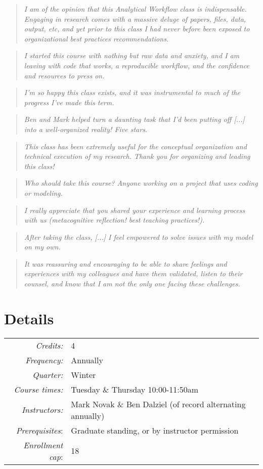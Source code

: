 \documentclass[10pt]{article}
\begin{document}
\begin{quote}
	\emph{I am of the opinion that this Analytical Workflow class is indispensable. Engaging in research 
	comes with a massive deluge of papers, files, data, output, etc, and yet prior to this class I had never 
	before been exposed to organizational best practices recommendations.}
\end{quote}
\begin{quote}
	\emph{I started this course with nothing but raw data and anxiety, and I am leaving with code that 
		works, a reproducible workflow, and the confidence and resources to press on.}
\end{quote}
\begin{quote}
	\emph{I'm so happy this class exists, and it was instrumental to much of the progress I've made this 
	term.}
\end{quote}
\begin{quote}
\emph{Ben and Mark helped turn a daunting task that I'd been putting off [...] into a 
well-organized reality! Five stars.}
\end{quote}
\begin{quote}
	\emph{This class has been extremely useful for the conceptual organization and technical execution 
	of my research. Thank you for organizing and leading this class!}
\end{quote}
\begin{quote}
	\emph{Who should take this course?  Anyone working on a project that uses coding or modeling.}
\end{quote}
\begin{quote}
	\emph{I really appreciate that you shared your experience and learning process with us (metacognitive 
		reflection! best teaching practices!).}
\end{quote}
\begin{quote}
	\emph{After taking the class, [...] I feel empowered to solve issues with my model on my own.}
\end{quote}
\begin{quote}
	\emph{It was reassuring and encouraging to be able to share feelings and experiences with my 
	colleagues and have them validated, listen to their counsel, and know that I am not the only one 
	facing these challenges.}
\end{quote}


\section*{Details}
\begin{tabular}{rl}
	\emph{Credits:}	&  4\\
	\emph{Frequency:} & Annually\\
	\emph{Quarter:} & Winter\\
	\emph{Course times:} &  Tuesday \& Thursday 10:00-11:50am\\
	\emph{Instructors:} & Mark Novak \& Ben Dalziel (of record alternating annually)\\
	\emph{Prerequisites}: & Graduate standing, or by instructor permission\\
	\emph{Enrollment cap}: & 18\\
\end{tabular}
\end{document}
